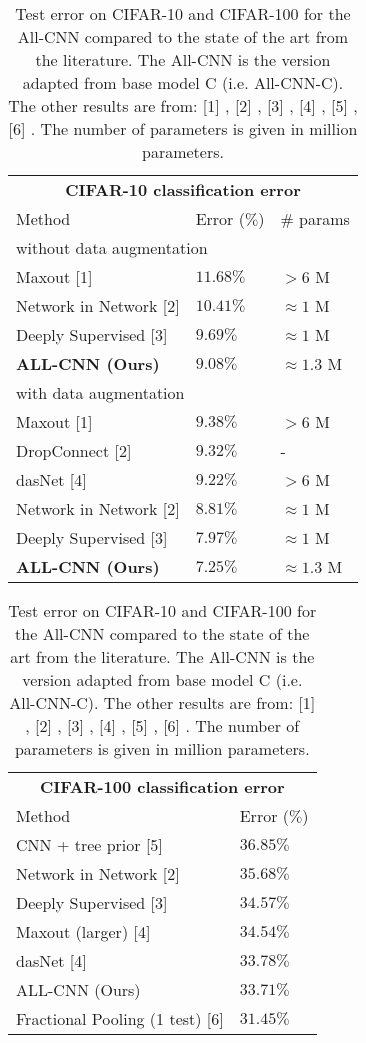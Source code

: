 \documentclass{article} \usepackage{iclr2015,times}
\begin{document}
\begin{table}[h]
\caption{Test error on CIFAR-10 and CIFAR-100 for the All-CNN compared to the
  state of the art from the literature. The All-CNN is the version
  adapted from base model C (i.e. All-CNN-C). The other results are from: [1]
  \citep{Goodfellow2013}, [2] \citep{Lin_2014}, [3] \citep{Lee_2014},
  [4] \citep{Stollenga_2014}, [5] \citep{Nitish2013}, [6] \citep{Graham2015}. The number of
  parameters is given in million parameters.}
\label{results-cifar10}
\begin{minipage}{0.49\linewidth}
\centering
\begin{tabular}{lll}
\multicolumn{3}{c}{\bf CIFAR-10 classification error} \\
\multicolumn{1}{l}{Method} & \multicolumn{1}{l}{Error ($\%$)} & \multicolumn{1}{l}{\# params} \\
\hline
\multicolumn{3}{l}{without data augmentation} \\
\hline
Maxout [1]          &  $11.68 \%$ & $> 6$ M \\
Network in Network [2]         &  $10.41 \%$ & $\approx 1$ M \\
Deeply Supervised [3]        & $9.69 \%$  & $\approx 1$ M \\
\textbf{ALL-CNN (Ours)}         &  $\mathbf{9.08 \%}$ & $\approx 1.3$ M \\
\hline
\multicolumn{3}{l}{with data augmentation} \\
\hline
Maxout [1]         &  $9.38 \%$ & $> 6$ M \\
DropConnect [2]         &  $9.32 \%$ & - \\
dasNet [4]         &  $9.22 \%$ & $> 6$ M \\
Network in Network [2]         &  $8.81 \%$ & $\approx 1$ M \\
Deeply Supervised [3]         & $7.97 \%$  & $\approx 1$ M \\
\textbf{ALL-CNN (Ours)}         &  $\mathbf{7.25 \%}$ & $\approx 1.3$ M \\
\end{tabular}
\end{minipage}
\hspace{0.5cm}
\begin{minipage}{0.49\linewidth}
\centering
\begin{tabular}{ll}
\multicolumn{2}{c}{\bf CIFAR-100 classification error } \\
Method & Error ($\%$) \\ \hline
CNN + tree prior [5]         &  $36.85 \%$ \\ Network in Network [2]         &  $35.68 \%$ \\Deeply Supervised [3]         & $34.57 \%$  \\ Maxout (larger) [4]         &  $34.54 \%$ \\ dasNet [4]         &  $33.78 \%$ \\ALL-CNN (Ours)         &  $33.71 \%$ \\Fractional Pooling (1 test) [6]  & $\mathbf{31.45} \%$ \\

\end{tabular}
\end{minipage}
\end{table}
\end{document}
